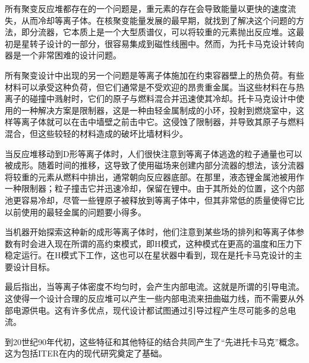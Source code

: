 所有聚变反应堆都存在的一个问题是，重元素的存在会导致能量以更快的速度流失，从而冷却等离子体。在核聚变能量发展的最早期，就找到了解决这个问题的方法，即分流器，它本质上是一个大型质谱仪，可以将较重的元素抛出反应堆。这最初是星转子设计的一部分，很容易集成到磁性线圈中。然而，为托卡马克设计转向器是一个非常困难的设计问题。

所有聚变设计中出现的另一个问题是等离子体施加在约束容器壁上的热负荷。有些材料可以承受这种负荷，但它们通常是不受欢迎的昂贵重金属。当这些材料在与热离子的碰撞中溅射时，它们的原子与燃料混合并迅速使其冷却。托卡马克设计中使用的一种解决方案是限制器，这是一种由轻金属制成的小环，投射到燃烧室中，这样等离子体就可以在击中墙壁之前击中它。这侵蚀了限制器，并导致其原子与燃料混合，但这些较轻的材料造成的破坏比墙材料少。

当反应堆移动到D形等离子体时，人们很快注意到等离子体逃逸的粒子通量也可以被成形。随着时间的推移，这导致了使用磁场来创建内部分流器的想法，该分流器将较重的元素从燃料中排出，通常朝向反应器底部。在那里，液态锂金属池被用作一种限制器；粒子撞击它并迅速冷却，保留在锂中。由于其所处的位置，这个内部池更容易冷却，尽管一些锂原子被释放到等离子体中，但其非常低的质量使得它比以前使用的最轻金属的问题要小得多。

当机器开始探索这种新的成形等离子体时，他们注意到某些场的排列和等离子体参数有时会进入现在所谓的高约束模式，即H模式，这种模式在更高的温度和压力下稳定运行。在H模式下工作，这也可以在星状器中看到，现在是托卡马克设计的主要设计目标。

最后指出，当等离子体密度不均匀时，会产生内部电流。这就是所谓的引导电流。这使得一个设计合理的反应堆可以产生一些内部电流来扭曲磁力线，而不需要从外部电源供电。这有许多优点，现代设计都试图通过引导过程产生尽可能多的总电流。

到20世纪90年代初，这些特征和其他特征的结合共同产生了“先进托卡马克”概念。这为包括ITER在内的现代研究奠定了基础。